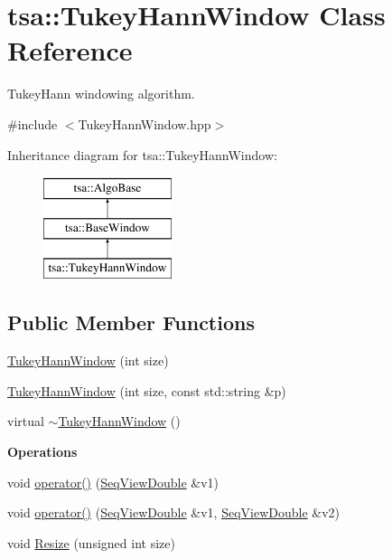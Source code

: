 \hypertarget{classtsa_1_1_tukey_hann_window}{}\section{tsa\+:\+:Tukey\+Hann\+Window Class Reference}
\label{classtsa_1_1_tukey_hann_window}


Tukey\+Hann windowing algorithm.  




{\ttfamily \#include $<$Tukey\+Hann\+Window.\+hpp$>$}

Inheritance diagram for tsa\+:\+:Tukey\+Hann\+Window\+:\begin{figure}[H]
\begin{center}
\leavevmode
\includegraphics[height=3.000000cm]{classtsa_1_1_tukey_hann_window}
\end{center}
\end{figure}
\subsection*{Public Member Functions}
\begin{DoxyCompactItemize}
\item 
\hyperlink{classtsa_1_1_tukey_hann_window_abdd4209c65b5774c0279a7ea2ce2fa7b}{Tukey\+Hann\+Window} (int size)
\item 
\hyperlink{classtsa_1_1_tukey_hann_window_ab883fbdd5791e0bbedede99126e17bf7}{Tukey\+Hann\+Window} (int size, const std\+::string \&p)
\item 
virtual \hyperlink{classtsa_1_1_tukey_hann_window_af6b96cf901725bc0bcc7cf79bef2d766}{$\sim$\+Tukey\+Hann\+Window} ()
\end{DoxyCompactItemize}
\begin{Indent}\textbf{ Operations}\par
\begin{DoxyCompactItemize}
\item 
void \hyperlink{classtsa_1_1_tukey_hann_window_a2a10c0c94b2c5ebbc1db201371074295}{operator()} (\hyperlink{namespacetsa_ac599574bcc094eda25613724b8f3ca9e}{Seq\+View\+Double} \&v1)
\item 
void \hyperlink{classtsa_1_1_tukey_hann_window_af889453b564781f9eca6993f2fd95646}{operator()} (\hyperlink{namespacetsa_ac599574bcc094eda25613724b8f3ca9e}{Seq\+View\+Double} \&v1, \hyperlink{namespacetsa_ac599574bcc094eda25613724b8f3ca9e}{Seq\+View\+Double} \&v2)
\item 
void \hyperlink{classtsa_1_1_tukey_hann_window_a253c1786cef6ec7b5e7ef700f4238496}{Resize} (unsigned int size)
\end{DoxyCompactItemize}
\end{Indent}
